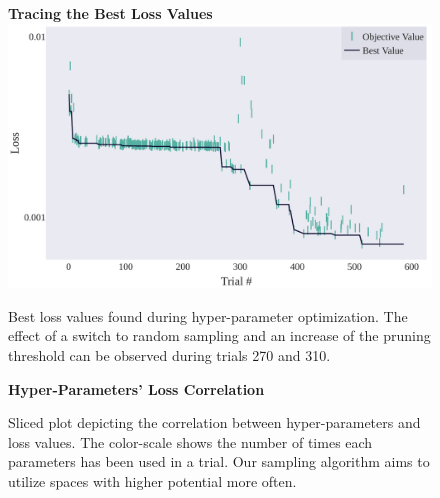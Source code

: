 \documentclass[runningheads,a4paper]{llncs}
\begin{document}
\begin{appendices}
\begin{figure}[htbp]
\centering
\textbf{Tracing the Best Loss Values}
\includegraphics[width=12cm,height=7cm]{images/Optimization_History.pdf}
\caption{Best loss values found during hyper-parameter optimization. The effect of a switch to random sampling and an increase of the pruning threshold can be observed during trials 270 and 310.}
\label{chap3:bestvalues}
\end{figure}

\begin{figure}
\begin{center}
    \textbf{Hyper-Parameters' Loss Correlation}
      \caption{Sliced plot depicting the correlation between hyper-parameters and loss values. The color-scale shows the number of times each parameters has been used in a trial. Our sampling algorithm aims to utilize spaces with higher potential more often. }
    \label{fig:slicegraph}
    \end{center}
\end{figure}


\end{appendices}
\end{document}
